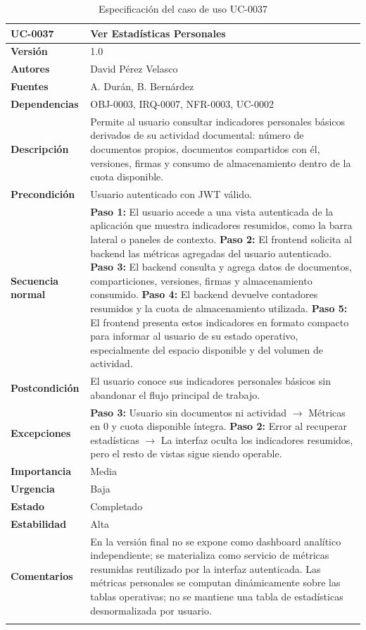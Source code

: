 \documentclass[11pt, a4paper]{article}
\begin{document}
\begin{longtable}{|p{4cm}|p{10cm}|}
\hline
\textbf{UC-0037} & Ver Estadísticas Personales \\
\hline
\textbf{Versión} & 1.0 \\
\hline
\textbf{Autores} & David Pérez Velasco \\
\hline
\textbf{Fuentes} & A. Durán, B. Bernárdez \\
\hline
\textbf{Dependencias} & OBJ-0003, IRQ-0007, NFR-0003, UC-0002 \\
\hline
\textbf{Descripción} & Permite al usuario consultar indicadores personales básicos derivados de su actividad documental: número de documentos propios, documentos compartidos con él, versiones, firmas y consumo de almacenamiento dentro de la cuota disponible. \\
\hline
\textbf{Precondición} & Usuario autenticado con JWT válido. \\
\hline
\textbf{Secuencia normal} &
\textbf{Paso 1:} El usuario accede a una vista autenticada de la aplicación que muestra indicadores resumidos, como la barra lateral o paneles de contexto.\newline
\textbf{Paso 2:} El frontend solicita al backend las métricas agregadas del usuario autenticado.\newline
\textbf{Paso 3:} El backend consulta y agrega datos de documentos, comparticiones, versiones, firmas y almacenamiento consumido.\newline
\textbf{Paso 4:} El backend devuelve contadores resumidos y la cuota de almacenamiento utilizada.\newline
\textbf{Paso 5:} El frontend presenta estos indicadores en formato compacto para informar al usuario de su estado operativo, especialmente del espacio disponible y del volumen de actividad.\\
\hline
\textbf{Postcondición} & El usuario conoce sus indicadores personales básicos sin abandonar el flujo principal de trabajo. \\
\hline
\textbf{Excepciones} &
\textbf{Paso 3:} Usuario sin documentos ni actividad $\rightarrow$ Métricas en 0 y cuota disponible íntegra.\newline
\textbf{Paso 2:} Error al recuperar estadísticas $\rightarrow$ La interfaz oculta los indicadores resumidos, pero el resto de vistas sigue siendo operable.\\
\hline
\textbf{Importancia} & Media \\
\hline
\textbf{Urgencia} & Baja \\
\hline
\textbf{Estado} & Completado \\
\hline
\textbf{Estabilidad} & Alta \\
\hline
\textbf{Comentarios} & En la versión final no se expone como dashboard analítico independiente; se materializa como servicio de métricas resumidas reutilizado por la interfaz autenticada. Las métricas personales se computan dinámicamente sobre las tablas operativas; no se mantiene una tabla de estadísticas desnormalizada por usuario. \\
\hline
\caption{Especificación del caso de uso UC-0037}
\end{longtable}
\end{document}
